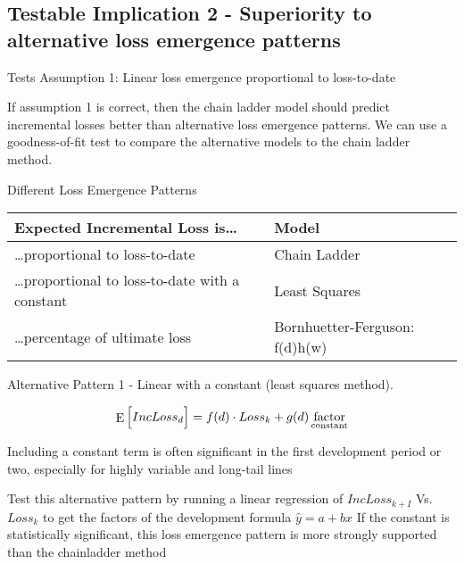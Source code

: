 \documentclass[
]{article}
\begin{document}
\subsection{Testable Implication 2 - Superiority to alternative loss
emergence
patterns}\label{testable-implication-2---superiority-to-alternative-loss-emergence-patterns}

Tests Assumption 1: Linear loss emergence proportional to loss-to-date

If assumption 1 is correct, then the chain ladder model should predict
incremental losses better than alternative loss emergence patterns. We
can use a goodness-of-fit test to compare the alternative models to the
chain ladder method.

Different Loss Emergence Patterns

\begin{longtable}[]{@{}
  >{\raggedright\arraybackslash}p{}
  >{\raggedright\arraybackslash}p{}@{}}
\toprule\noalign{}
\begin{minipage}[b]{\linewidth}\raggedright
Expected Incremental Loss is\ldots{}
\end{minipage} & \begin{minipage}[b]{\linewidth}\raggedright
Model
\end{minipage} \\
\midrule\noalign{}
\endhead
\bottomrule\noalign{}
\endlastfoot
\ldots proportional to loss-to-date & Chain Ladder \\
\ldots proportional to loss-to-date with a constant & Least Squares \\
\ldots percentage of ultimate loss & Bornhuetter-Ferguson: f(d)h(w) \\
\end{longtable}

Alternative Pattern 1 - Linear with a constant (least squares method).

\[\mathop{\mathrm{E}}\Big[IncLoss_{d}\Big]=f(d)\cdot Loss_{k}+g(d)\\\mathop{\mathrm{factor}}_{\mathrm{constant}}\]

Including a constant term is often significant in the first development
period or two, especially for highly variable and long-tail lines

Test this alternative pattern by running a linear regression of
\(IncLoss_{k+I}\) Vs. \(Loss_k\) to get the factors of the development
formula \(\hat{y}=a+bx\) If the constant is statistically significant,
this loss emergence pattern is more strongly supported than the
chainladder method
\end{document}
